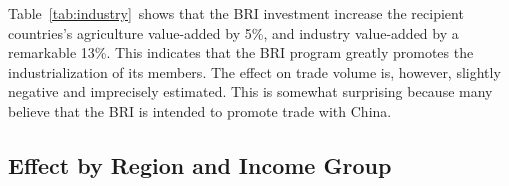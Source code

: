 \documentclass[10pt,a4paper]{article}
\begin{document}
Table~{\ref{tab:industry}}~shows that the BRI
investment increase the recipient countries's agriculture value-added by
5\%, and industry value-added by a remarkable 13\%. This indicates that
the BRI program greatly promotes the industrialization of its members.
The effect on trade volume is, however, slightly negative and
imprecisely estimated. This is somewhat surprising because many believe
that the BRI is intended to promote trade with China.~

\par\null

\subsection{Effect by Region and Income
Group}

{\label{689555}}
\end{document}
